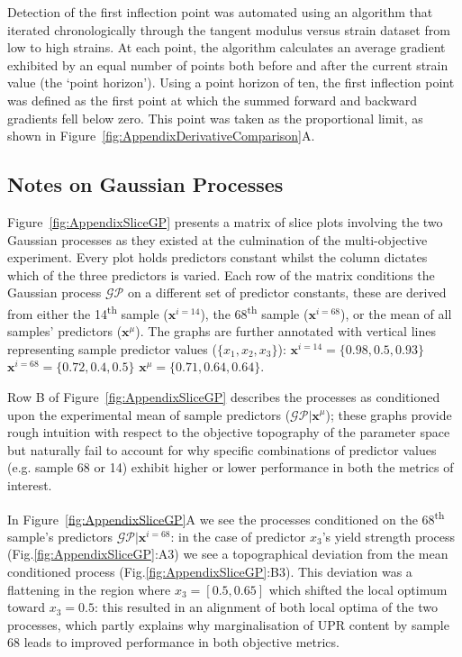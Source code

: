 Detection of the first inflection point was automated using an
 algorithm that iterated chronologically through the tangent modulus versus
 strain dataset from low to high strains.
At each point, the algorithm calculates an average gradient exhibited
 by an equal number of points both before and after the current strain
 value (the `point horizon').
Using a point horizon of ten, the first inflection point was defined as
 the first point at which the summed forward and backward gradients fell
 below zero.
This point was taken as the proportional limit, as shown in 
 Figure~\ref{fig:AppendixDerivativeComparison}A.

\subsection{Notes on Gaussian Processes}
Figure~\ref{fig:AppendixSliceGP} presents a matrix of slice plots involving the two
 Gaussian processes as they existed at the culmination of the multi-objective
 experiment.
Every plot holds  predictors constant whilst the column
 dictates which of the three predictors is varied.
Each row of the matrix conditions the Gaussian process \(\mathcal{GP}\) on a
 different set of predictor constants, these are derived from either the 
 14\textsuperscript{th} sample (\(\mathbf{x}^{i=14}\)), the
 68\textsuperscript{th} sample (\(\mathbf{x}^{i=68}\)), or the
 mean of all samples' predictors (\(\mathbf{x}^{\mu}\)).
The graphs are further annotated with vertical lines representing sample
 predictor values (\(\{x_{1},x_{2},x_{3}\}\)):
 \(\mathbf{x}^{i=14}=\{0.98,0.5,0.93\}\)
 \(\mathbf{x}^{i=68}=\{0.72,0.4,0.5\}\)
 \(\mathbf{x}^{\mu}=\{0.71,0.64,0.64\}\).

Row B of Figure~\ref{fig:AppendixSliceGP} describes the processes as conditioned
 upon the experimental mean of sample predictors
 (\(\mathcal{GP}|\mathbf{x}^{\mu}\)); these graphs provide rough
 intuition with respect to the objective topography of the parameter space
 but naturally fail to account for why specific combinations of
 predictor values (e.g. sample 68 or 14) exhibit higher or lower performance
 in both the metrics of interest.

In Figure~\ref{fig:AppendixSliceGP}A we see the processes conditioned on the
 68\textsuperscript{th} sample's predictors
 \(\mathcal{GP}|\mathbf{x}^{i=68}\): in the case of predictor \(x_{3}\)'s
 yield strength process (Fig.\ref{fig:AppendixSliceGP}:A3) we see a topographical
 deviation from the mean conditioned process (Fig.\ref{fig:AppendixSliceGP}:B3).
This deviation was a flattening in the region where \(x_{3}=[0.5,0.65]\)
 which shifted the local optimum toward \(x_{3}=0.5\): this resulted in an
 alignment of both local optima of the two processes, which partly explains
 why marginalisation of UPR content by sample 68 leads to improved
 performance in both objective metrics.

